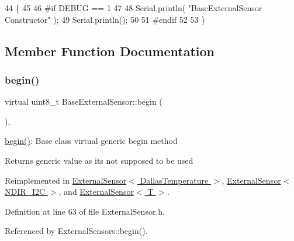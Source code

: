 \begin{DoxyCode}
44     \{
45 
46 \textcolor{preprocessor}{    #if DEBUG == 1 }
47 
48         Serial.println( \textcolor{stringliteral}{"BaseExternalSensor Constructor"} );
49         Serial.println();
50     
51 \textcolor{preprocessor}{    #endif}
52 
53     \}
\end{DoxyCode}


\subsection{Member Function Documentation}
\mbox{\label{classBaseExternalSensor_a87d132803d4f4fdd4e66332809f0c9a0}} 
\subsubsection{\texorpdfstring{begin()}{begin()}}
{\footnotesize\ttfamily virtual uint8\+\_\+t Base\+External\+Sensor\+::begin (\begin{DoxyParamCaption}{ }\end{DoxyParamCaption})\hspace{0.3cm}{\ttfamily [inline]}, {\ttfamily [virtual]}}

\hyperlink{classBaseExternalSensor_a87d132803d4f4fdd4e66332809f0c9a0}{begin()}\+: Base class virtual generic begin method

\begin{DoxyReturn}{Returns}
generic value as it\textquotesingle{}s not supposed to be used 
\end{DoxyReturn}


Reimplemented in \hyperlink{classExternalSensor_3_01DallasTemperature_01_4_ac5275129b05e2ff8df45d5b222a661d9}{External\+Sensor$<$ Dallas\+Temperature $>$}, \hyperlink{classExternalSensor_3_01NDIR__I2C_01_4_ac6f3614d94968ef0cc11b2b4d69cef03}{External\+Sensor$<$ N\+D\+I\+R\+\_\+\+I2\+C $>$}, and \hyperlink{classExternalSensor_ab6fe1379d55b656a048e0fba1e0a32e6}{External\+Sensor$<$ T $>$}.



Definition at line 63 of file External\+Sensor.\+h.



Referenced by External\+Sensors\+::begin().



